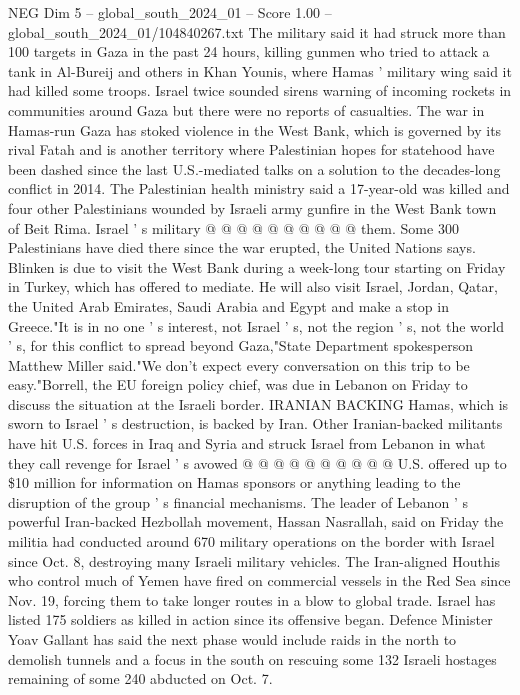 \begin{textsample}{NEG Dim 5 – global\_south\_2024\_01 – Score 1.00 – global\_south\_2024\_01/104840267.txt}
The military said it had struck more than 100 targets in Gaza in the past 24 hours, killing gunmen who tried to attack a tank in Al-Bureij and others in Khan Younis, where Hamas ' military wing said it had killed some troops.
Israel twice sounded sirens warning of incoming rockets in communities around Gaza but there were no reports of casualties.
The war in Hamas-run Gaza has stoked violence in the West Bank, which is governed by its rival Fatah and is another territory where Palestinian hopes for statehood have been dashed since the last U.S.-mediated talks on a solution to the decades-long conflict in 2014.
The Palestinian health ministry said a 17-year-old was killed and four other Palestinians wounded by Israeli army gunfire in the West Bank town of Beit Rima.
Israel ' s military @ @ @ @ @ @ @ @ @ @ them.
Some 300 Palestinians have died there since the war erupted, the United Nations says.
Blinken is due to visit the West Bank during a week-long tour starting on Friday in Turkey, which has offered to mediate.
He will also visit Israel, Jordan, Qatar, the United Arab Emirates, Saudi Arabia and Egypt and make a stop in Greece."It is in no one ' s interest, not Israel ' s, not the region ' s, not the world ' s, for this conflict to spread beyond Gaza,"State Department spokesperson Matthew Miller said."We don't expect every conversation on this trip to be easy."Borrell, the EU foreign policy chief, was due in Lebanon on Friday to discuss the situation at the Israeli border.
IRANIAN BACKING Hamas, which is sworn to Israel ' s destruction, is backed by Iran.
Other Iranian-backed militants have hit U.S. forces in Iraq and Syria and struck Israel from Lebanon in what they call revenge for Israel ' s avowed @ @ @ @ @ @ @ @ @ @ U.S. offered up to \$10 million for information on Hamas sponsors or anything leading to the disruption of the group ' s financial mechanisms.
The leader of Lebanon ' s powerful Iran-backed Hezbollah movement, Hassan Nasrallah, said on Friday the militia had conducted around 670 military operations on the border with Israel since Oct. 8, destroying many Israeli military vehicles.
The Iran-aligned Houthis who control much of Yemen have fired on commercial vessels in the Red Sea since Nov. 19, forcing them to take longer routes in a blow to global trade.
Israel has listed 175 soldiers as killed in action since its offensive began.
Defence Minister Yoav Gallant has said the next phase would include raids in the north to demolish tunnels and a focus in the south on rescuing some 132 Israeli hostages remaining of some 240 abducted on Oct. 7.

\end{textsample}
